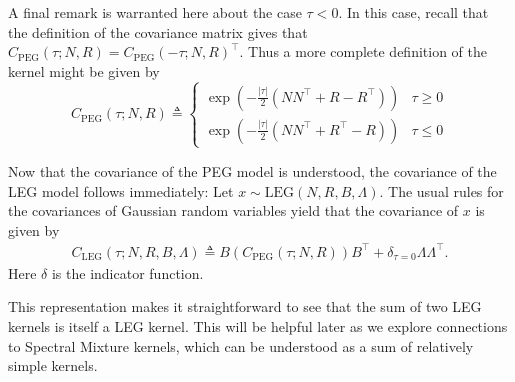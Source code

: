 \documentclass{article}
\theoremstyle{definition}
\newcommand{\LEG}{\mathrm{LEG}}
\newcommand{\LEGGP}{\mathrm{LEG}}
\newcommand{\PEG}{\mathrm{PEG}}
\begin{document}
A final remark is warranted here about the case $\tau<0$.  In this case, recall that the definition of the covariance matrix gives that $C_{\PEG}(\tau;N,R) =C_{\PEG}(-\tau;N,R)^\top$.  Thus a more complete  definition of the kernel might be given by 
\[
C_{\PEG}(\tau;N,R)  \triangleq 
\begin{cases}
\exp\left(-\frac{|\tau|}{2}\left(N N^\top + R-R^\top\right)\right) & \tau \geq 0\\
\exp\left(-\frac{|\tau|}{2}\left(N N^\top + R^\top-R\right)\right) & \tau \leq 0
\end{cases}
\]

Now that the covariance of the PEG model is understood, the covariance of the LEG model follows immediately:
Let $x \sim \LEGGP(N,R,B,\Lambda)$.  The usual rules for the covariances of Gaussian random variables yield that the covariance of $x$ is given by 
\begin{gather*}
C_\LEG(\tau;N,R,B,\Lambda) \triangleq
B \left(C_\PEG(\tau;N,R)\right) B^\top + \delta_{\tau=0} \Lambda \Lambda^\top.
\end{gather*}
Here $\delta$ is the indicator function.  

This representation makes it straightforward to see that the sum of two LEG kernels is itself a LEG kernel.  This will be helpful later as we explore connections to Spectral Mixture kernels, which can be understood as a sum of relatively simple kernels.
\end{document}
